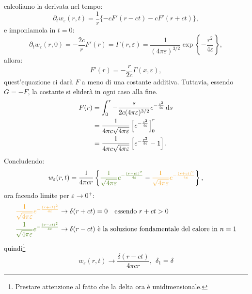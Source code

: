 calcoliamo la derivata nel tempo:
\begin{equation*}
    \partial _{t} w_{\varepsilon }(r,t) =\frac{1}{r}\{-cF'(r-ct) -cF'(r+ct)\} ,
\end{equation*}
e imponiamola in $t=0$:
\begin{equation*}
    \partial _{t} w_{\varepsilon }(r,0) =-\frac{2c}{r} F'(r) =\Gamma (r,\varepsilon) =\frac{1}{(4\pi \varepsilon)^{3/2}}\exp\left\{-\frac{r^{2}}{4\varepsilon }\right\} ,
\end{equation*}
allora:
\begin{equation*}
    F'(r) =-\frac{r}{2c} \Gamma (x,\varepsilon) ,
\end{equation*}
quest'equazione ci darà $F$ a meno di una costante additiva. Tuttavia, essendo $G=-F$, la costante si eliderà in ogni caso alla fine.
\begin{align*}
    F(r) & =\int _{0}^{r} -\frac{s}{2c(4\pi \varepsilon)^{3/2}} e^{-\frac{s^{2}}{4\varepsilon }} \,\mathrm d s       \\
         & =\frac{1}{4\pi c\sqrt{4\pi \varepsilon }}\left[ e^{-\frac{s^{2}}{4\varepsilon }}\right]_{0}^{r} \\
         & =\frac{1}{4\pi c\sqrt{4\pi \varepsilon }}\left[ e^{-\frac{r^{2}}{4\varepsilon }} -1\right] .
\end{align*}
Concludendo:
\begin{equation*}
    w_{\varepsilon }(r,t) =\frac{1}{4\pi cr}\left\{\textcolor[rgb]{0.25,0.46,0.02}{\frac{1}{\sqrt{4\pi \varepsilon }}e^{-\frac{(r-ct)^{2}}{4\varepsilon}}} -\textcolor[rgb]{0.96,0.65,0.14}{\frac{1}{\sqrt{4\pi \varepsilon }}e^{-\frac{(r+ct)^{2}}{4\varepsilon}}}\right\} ,
\end{equation*}
ora facendo limite per $\displaystyle \varepsilon \rightarrow 0^{+}$:
\begin{align*}
    \textcolor[rgb]{0.96,0.65,0.14}{\frac{1}{\sqrt{4\pi \varepsilon }}e^{-\frac{(r+ct)^{2}}{4\varepsilon}}} & \rightarrow \delta (r+ct)=0 \quad \text{essendo} \ r+ct>0                        \\
    \textcolor[rgb]{0.25,0.46,0.02}{\frac{1}{\sqrt{4\pi \varepsilon }}e^{-\frac{(r-ct)^{2}}{4\varepsilon}}} & \rightarrow \delta (r-ct)\ \text{è la soluzione fondamentale del calore in}\ n=1
\end{align*}
quindi\footnote{Prestare attenzione al fatto che la delta ora è unidimensionale.}
\begin{equation*}
    w_{\varepsilon }(r,t)\rightarrow \frac{\delta (r-ct)}{4\pi cr} ,\ \ \delta _{1} =\delta
\end{equation*}
